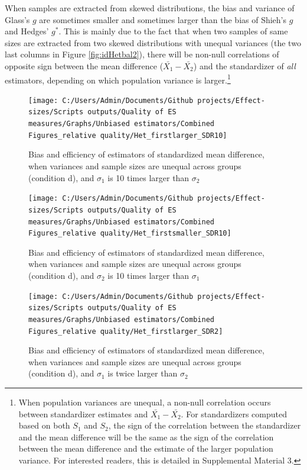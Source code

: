 \documentclass[
  english,
  man]{apa6}
\begin{document}
When samples are extracted from skewed distributions, the bias and variance of Glass's \(g\) are sometimes smaller and sometimes larger than the bias of Shieh's \(g\) and Hedges' \(g^*\). This is mainly due to the fact that when two samples of same sizes are extracted from two skewed distributions with unequal variances (the two last columns in Figure \ref{fig:idHetbal2}), there will be non-null correlations of opposite sign between the mean difference (\(\bar{X_1}-\bar{X_2}\)) and the standardizer of \emph{all} estimators, depending on which population variance is larger.\footnote{When population variances are unequal, a non-null correlation occurs between standardizer estimates and $\bar{X_1}-\bar{X_2}$. For standardizers computed based on both $S_1$ and $S_2$, the sign of the correlation between the standardizer and the mean difference will be the same as the sign of the correlation between the mean difference and the estimate of the larger population variance. For interested readers, this is detailed in Supplemental Material 3.}

\begin{figure}

{\centering \texttt{[image: C:/Users/Admin/Documents/Github projects/Effect-sizes/Scripts outputs/Quality of ES measures/Graphs/Unbiased estimators/Combined Figures\_relative quality/Het\_firstlarger\_SDR10]} 

}

\caption{Bias and efficiency of estimators of standardized mean difference, when variances and sample sizes are unequal across groups (condition d), and $\sigma_1$ is 10 times larger than $\sigma_2$}\label{fig:idHetunbal1}
\end{figure}

\begin{figure}

{\centering \texttt{[image: C:/Users/Admin/Documents/Github projects/Effect-sizes/Scripts outputs/Quality of ES measures/Graphs/Unbiased estimators/Combined Figures\_relative quality/Het\_firstsmaller\_SDR10]} 

}

\caption{Bias and efficiency of estimators of standardized mean difference, when variances and sample sizes are unequal across groups (condition d), and $\sigma_2$ is 10 times larger than $\sigma_1$}\label{fig:idHetunbal2}
\end{figure}

\begin{figure}

{\centering \texttt{[image: C:/Users/Admin/Documents/Github projects/Effect-sizes/Scripts outputs/Quality of ES measures/Graphs/Unbiased estimators/Combined Figures\_relative quality/Het\_firstlarger\_SDR2]} 

}

\caption{Bias and efficiency of estimators of standardized mean difference, when variances and sample sizes are unequal across groups (condition d), and $\sigma_1$ is twice larger than $\sigma_2$}\label{fig:idHetunbal3}
\end{figure}
\end{document}
